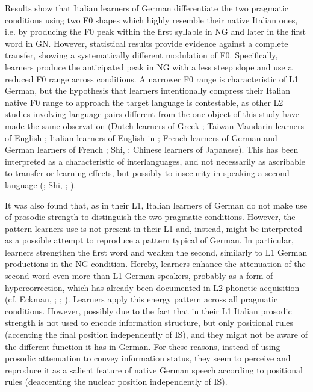 Results show that Italian learners of German differentiate the two pragmatic conditions using two F0 shapes which highly resemble their native Italian ones, i.e. by producing the F0 peak within the first syllable in NG and later in the first word in GN. However, statistical results provide evidence against a complete transfer, showing a systematically different modulation of F0. Specifically, learners produce the anticipated peak in NG with a less steep slope and use a reduced F0 range across conditions. A narrower F0 range is characteristic of L1 German, but the hypothesis that learners intentionally compress their Italian native F0 range to approach the target language is contestable, as other L2 studies involving language pairs different from the one object of this study have made the same observation (Dutch learners of Greek \citealt{Mennen1998}; Taiwan Mandarin learners of English \citealt{ViscegliaEtAl2011}; Italian learners of English in \citealt{Urbani2012}; French learners of German and German learners of French \citealt{ZimmererEtAl2014}; Shi, \citealt{ZhangXie2014}: Chinese learners of Japanese). This has been interpreted as a characteristic of interlanguages, and not necessarily as ascribable to transfer or learning effects, but possibly to insecurity in speaking a second language (\citealt{Mennen1998}; Shi, \citealt{ZhangXie2014}; \citealt{ZimmererEtAl2014}).

It was also found that, as in their L1, Italian learners of German do not make use of prosodic strength to distinguish the two pragmatic conditions. However, the pattern learners use is not present in their L1 and, instead, might be interpreted as a possible attempt to reproduce a pattern typical of German. In particular, learners strengthen the first word and weaken the second, similarly to L1 German productions in the NG condition. Hereby, learners enhance the attenuation of the second word even more than L1 German speakers, probably as a form of hypercorrection, which has already been documented in L2 phonetic acquisition (cf. Eckman, \citealt{IversonSong2013}; \citealt{Kelly2022}; \citealt{Petrov2021}). Learners apply this energy pattern across all pragmatic conditions. However, possibly due to the fact that in their L1 Italian prosodic strength is not used to encode information structure, but only positional rules (accenting the final position independently of IS), and they might not be aware of the different function it has in German. For these reasons, instead of using prosodic attenuation to convey information status, they seem to perceive and reproduce it as a salient feature of native German speech according to positional rules (deaccenting the nuclear position independently of IS).

